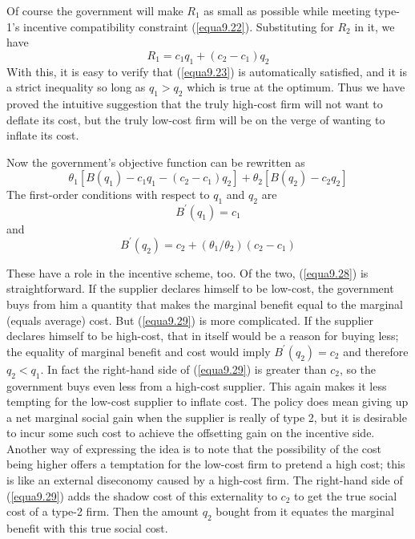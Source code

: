 Of course the government will make $R_1$ as small as possible while meeting type-1's incentive compatibility constraint (\ref{equa9.22}). Substituting for $R_2$ in it, we have
\begin{equation} \label{equa9.27}
R_1 = c_1 q_1 + (c_2 - c_1) q_2
\end{equation}
With this, it is easy to verify that (\ref{equa9.23}) is automatically satisfied, and it is a strict inequality so long as $q_1 > q_2$ which is true at the optimum. Thus we have proved the intuitive suggestion that the truly high-cost firm will not want to deflate its cost, but the truly low-cost firm will be on the verge of wanting to inflate its cost.

Now the government's objective function can be rewritten as 
\begin{equation*}
\theta_1  [B(q_1) - c_1 q_1 - (c_2 - c_1)q_2] + \theta_2[B(q_2) - c_2 q_2]
\end{equation*}
The first-order conditions with respect to $q_1$ and $q_2$ are
\begin{equation} \label{equa9.28}
B^\prime(q_1) = c_1
\end{equation}
and
\begin{equation} \label{equa9.29}
B^\prime(q_2) = c_2 + (\theta_1/\theta_2)(c_2 - c_1)
\end{equation}

These have a role in the incentive scheme, too. Of the two, (\ref{equa9.28}) is straightforward. If the supplier declares himself to be low-cost, the government buys from him a quantity that makes the marginal benefit equal to the marginal (equals average) cost. But (\ref{equa9.29}) is more complicated. If the supplier declares himself to be high-cost, that in itself would be a reason for buying less; the equality of marginal benefit and cost would imply $B^\prime(q_2)=c_2$ and therefore $q_2 < q_1$. In fact the right-hand side of (\ref{equa9.29}) is greater than $c_2$, so the government buys even less from a high-cost supplier. This again makes it less tempting for the low-cost supplier to inflate cost. The policy does mean giving up a net marginal social gain when the supplier is really of type 2, but it is desirable to incur some such cost to achieve the offsetting gain on the incentive side. Another way of expressing the idea is to note that the possibility of the cost being higher offers a temptation for the low-cost firm to pretend a high cost; this is like an external diseconomy caused by a high-cost firm. The right-hand side of (\ref{equa9.29}) adds the shadow cost of this externality to $c_2$ to get the true social cost of a type-2 firm. Then the amount $q_2$ bought from it equates the marginal benefit with this true social cost.

